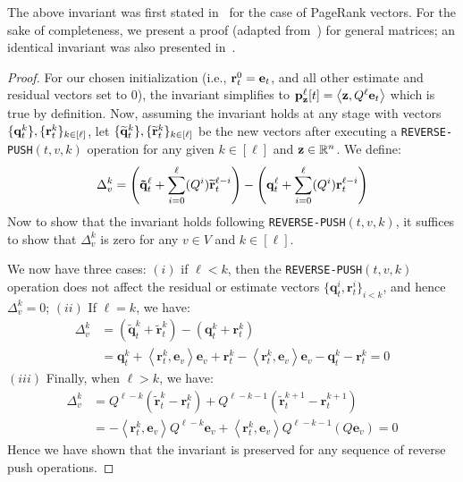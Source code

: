 The above invariant was first stated in~\cite{andersen2007local} for the case of PageRank vectors. 
For the sake of completeness, we present a proof (adapted from~\cite{Lofgren2014}) for general matrices; an identical invariant was also presented in~\cite{lee2014asynchronous}.

\begin{proof}
For our chosen initialization (i.e., $\mathbf{r}^{0}_t = \mathbf{e}_t$, and all other estimate and residual vectors set to $0$), the invariant simplifies to $\mathbf{p}_{\mathbf{z}}^{\ell}[t] = \left< \mathbf{z} , Q^{\ell}\mathbf{e}_t \right>$ which is true by definition.
Now, assuming the invariant holds at any stage with vectors $\{\mathbf{q}^{k}_t\}, \{\mathbf{r}^{k}_t\}_{k\in[\ell]}$, let $\{\widetilde{\mathbf{q}}^{k}_t\}, \{\widetilde{\mathbf{r}}^{k}_t\}_{k\in[\ell]}$ be the new vectors after executing a \texttt{REVERSE-PUSH}$(t,v,k)$ operation for any given $k\in[\ell]$ and $\mathbf{z}\in\mathbb{R}^n$. We define:
$$\Delta_v^{k} = \left( \mathbf{\tilde{q}}_t^{\ell} + \sum_{i=0}^{\ell}  (Q^i)\widetilde{\mathbf{r}}^{\ell-i}_t \right)- \left( \mathbf{q}^{\ell}_t + \sum_{i=0}^{\ell}  (Q^i) \mathbf{r}_t^{\ell-i}\right)$$
Now to show that the invariant holds following \texttt{REVERSE-PUSH}$(t,v,k)$, it suffices to show that $\Delta_v^{k}$ is zero for any $v\in V$ and $k\in[\ell]$. 

We now have three cases: $(i)$ if $\ell < k$, then the \texttt{REVERSE-PUSH}$(t,v,k)$ operation does not affect the residual or estimate vectors $\{\mathbf{q}_t^{i},\mathbf{r}_t^{i}\}_{i<k}$, and hence 
$\Delta_v^k=0$;
$(ii)$ If $\ell = k$, we have:
\begin{align*}
\Delta_v^{k} &= \left( \mathbf{\tilde{q}}_t^{k} +  \mathbf{\tilde{r}}_t^{k}\right)- \left( \mathbf{q}_t^{k} + \mathbf{r}_t^{k}\right)\\
&= \mathbf{q}_t^{k} + \left<\mathbf{r}_t^{k}, \mathbf{e}_v \right>\mathbf{e}_v +  \mathbf{r}_t^{k} - \left<\mathbf{r}_t^{k}, \mathbf{e}_v \right>\mathbf{e}_v - \mathbf{q}_t^{k} - \mathbf{r}_t^{k}
= 0
\end{align*}
$(iii)$ Finally, when $\ell > k$, we have: 
\begin{align*}
\Delta_v^k &= Q^{\ell-k}\left( \mathbf{\tilde{r}}_t^k - \mathbf{r}_t^k \right) + Q^{\ell-k-1}\left( \mathbf{\tilde{r}}_t^{k+1} - \mathbf{r}_t^{k+1} \right)\\
&= -\left<\mathbf{r}_t^k, \mathbf{e}_v \right>Q^{\ell-k}\mathbf{e}_v  + \left<\mathbf{r}_t^k, \mathbf{e}_v \right>Q^{\ell-k-1}\left(Q\mathbf{e}_v \right)
= 0
\end{align*}
Hence we have shown that the invariant is preserved for any sequence of reverse push operations.
\end{proof}


